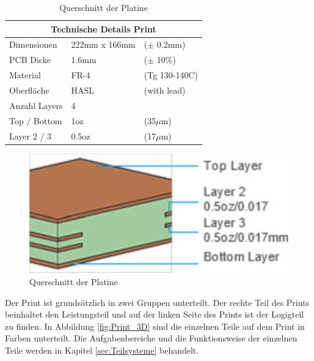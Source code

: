 \begin{table}[H]%
\centering
\parbox{0.5\textwidth}{
\begin{footnotesize}
\begin{tabular}{|l|ll|}
\hline
\multicolumn{3}{|c|}{\textbf{Technische Details Print}}\\
\hline
Dimensionen & 222mm x 166mm & ($\pm$ 0.2mm)\\
\hline
PCB Dicke & 1.6mm & ($\pm$ 10\%)\\
\hline
Material & FR-4 & (Tg 130-140C)\\
\hline
Oberfläche & HASL & (with lead)\\
\hline
Anzahl Layers & 4 & \\
\hline
Top / Bottom & 1oz & (35$\mu$m)\\
\hline
Layer 2 / 3 & 0.5oz & (17$\mu$m)\\
\hline
\end{tabular}
\end{footnotesize}
\caption{Spezifikationen der Platine \cite{jlcpcb_jlcpcb_2020}}
\label{tab:table}
}
\qquad
\begin{minipage}[c]{0.43\textwidth}%
\centering
\begin{figure}[H]
    \includegraphics[width=1\textwidth]{graphics/Print_Layers}
\caption{Querschnitt der Platine \cite{jlcpcb_jlcpcb_2020}}
\label{fig:figure}
\end{figure}
\end{minipage}
\end{table}

Der Print ist grundsätzlich in zwei Gruppen unterteilt. Der rechte Teil des Prints beinhaltet den Leistungsteil und auf der linken Seite des Prints ist der Logigteil zu finden. In Abbildung \ref{fig:Print_3D} sind die einzelnen Teile auf dem Print in Farben unterteilt. Die Aufgabenbereiche und die Funktionsweise der einzelnen Teile werden in Kapitel \ref{sec:Teilsysteme} behandelt.\\

